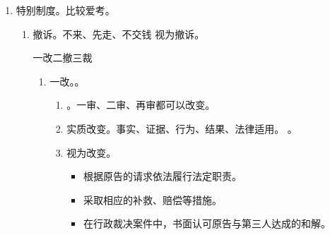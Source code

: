 \begin{enumerate}
\begin{enumerate}
\begin{enumerate}
                        \begin{enumerate}
                          \item 认为的，应当。
                          \item 认为的，在的同时，可以行政赔偿问题进行。
                        \end{enumerate}
                  \item 遗漏普通请求。不同民诉！！
                        \begin{enumerate}
                          \item 应当裁定撤销一审判决。
                          \item 应当裁定发回一审法院重审，一审法院应当重新组成合议庭。
                        \end{enumerate}
                \end{enumerate}
        \end{enumerate}
  \item 特别制度。比较爱考。
        \begin{enumerate}
          \item 撤诉。不来、先走、不交钱 \yjt 视为撤诉。
                \begin{kk}{一改二撤三裁}
                  \begin{enumerate}
                    \item 一改。。
                          \begin{enumerate}
                            \item {}。一审、二审、再审都可以改变。
                            \item 实质改变。事实、证据、行为、结果、法律适用。
                                  。
                            \item 视为改变。
                                  \begin{itemize}
                                    \item 根据原告的请求依法履行法定职责。
                                    \item 采取相应的补救、赔偿等措施。
                                    \item 在行政裁决案件中，书面认可原告与第三人达成的和解。
                                  \end{itemize}

\end{enumerate}
\end{enumerate}
\end{kk}
\end{enumerate}
\end{enumerate}
